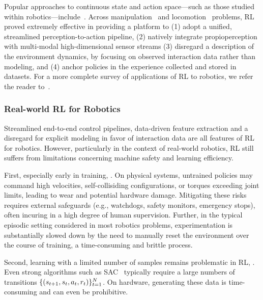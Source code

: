 Popular approaches to continuous state and action space---such as those studied within robotics---include~\citet{schulmanTrustRegionPolicy2017, schulmanProximalPolicyOptimization2017, haarnojaSoftActorCriticOffPolicy2018}.
Across manipulation~\citep{akkayaSolvingRubiksCube2019} and locomotion~\citep{leeLearningQuadrupedalLocomotion2020} problems, RL proved extremely effective in providing a platform to (1) adopt a unified, streamlined perception-to-action pipeline, (2) natively integrate propioperception with multi-modal high-dimensional sensor streams  (3) disregard a description of the environment dynamics, by focusing on observed interaction data rather than modeling, and (4) anchor policies in the experience collected and stored in datasets.
For a more complete survey of applications of RL to robotics, we refer the reader to~\citet{koberReinforcementLearningRobotics,tangDeepReinforcementLearning2024}.

\subsubsection{Real-world RL for Robotics}
Streamlined end-to-end control pipelines, data-driven feature extraction and a disregard for explicit modeling in favor of interaction data are all features of RL for robotics.
However, particularly in the context of real-world robotics, RL still suffers from limitations concerning machine safety and learning efficiency.

First, especially early in training, .
On physical systems, untrained policies may command high velocities, self-collisiding configurations, or torques exceeding joint limits, leading to wear and potential hardware damage.
Mitigating these risks requires external safeguards (e.g., watchdogs, safety monitors, emergency stops), often incuring in a high degree of human supervision.
Further, in the typical episodic setting considered in most robotics problems, experimentation is substantially slowed down by the need to manually reset the environment over the course of training, a time-consuming and brittle process.

Second, learning with a limited number of samples remains problematic in RL, .
Even strong algorithms such as SAC~\citep{haarnojaSoftActorCriticOffPolicy2018} typically require a large numbers of transitions \( \{ (s_{t+1}, s_t, a_t, r_t) \}_{t=1}^N \).
On hardware, generating these data is time-consuming and can even be prohibitive.

